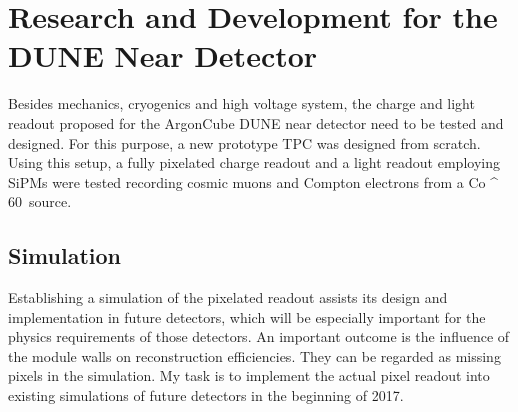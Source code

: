 \chapter{Research and Development for the DUNE Near Detector\label{chap:rd-dune-nd}}

Besides mechanics, cryogenics and high voltage system, the charge and light readout proposed for the ArgonCube DUNE near detector need to be tested and designed.
For this purpose, a new prototype TPC was designed from scratch.
Using this setup, a fully pixelated charge readout and a light readout employing SiPMs were tested recording cosmic muons and Compton electrons from a \si{Co ^ {60}} source.


\section{Simulation\label{sec:rd-dune-nd_simulation}}

Establishing a simulation of the pixelated readout assists its design and implementation in future detectors, which will be especially important for the physics requirements of those detectors.
An important outcome is the influence of the module walls on reconstruction efficiencies.
They can be regarded as missing pixels in the simulation.
My task is to implement the actual pixel readout into existing simulations of future detectors in the beginning of 2017.
